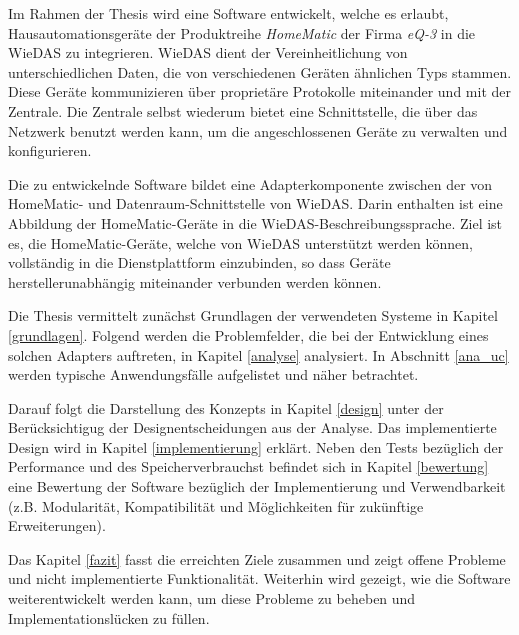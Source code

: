 Im Rahmen der Thesis wird eine Software entwickelt, welche es erlaubt, Hausautomationsgeräte der Produktreihe
\emph{HomeMatic} der Firma \emph{eQ-3} in die WieDAS zu integrieren.
WieDAS dient der Vereinheitlichung von unterschiedlichen Daten, die von verschiedenen Geräten ähnlichen
Typs stammen.
Diese Geräte kommunizieren über proprietäre Protokolle miteinander und mit der Zentrale.
Die Zentrale selbst wiederum bietet eine Schnittstelle, die über das Netzwerk benutzt werden kann, um die
angeschlossenen Geräte zu verwalten und konfigurieren.

Die zu entwickelnde Software bildet eine Adapterkomponente zwischen der von HomeMatic- und Datenraum-Schnittstelle von
WieDAS.
Darin enthalten ist eine Abbildung der HomeMatic-Geräte in die WieDAS-Beschreibungssprache.
Ziel ist es, die HomeMatic-Geräte, welche von WieDAS unterstützt werden können, vollständig in die
Dienstplattform einzubinden, so dass Geräte herstellerunabhängig miteinander verbunden werden können.

Die Thesis vermittelt zunächst Grundlagen der verwendeten Systeme in Kapitel \ref{grundlagen}.
Folgend werden die Problemfelder, die bei der Entwicklung eines solchen Adapters auftreten, in
Kapitel \ref{analyse} analysiert.
In Abschnitt \ref{ana_uc} werden typische Anwendungsfälle aufgelistet und näher betrachtet.

Darauf folgt die Darstellung des Konzepts in Kapitel \ref{design} unter der Berücksichtigug der
Designentscheidungen aus der Analyse.
Das implementierte Design wird in Kapitel \ref{implementierung} erklärt.
Neben den Tests bezüglich der Performance und des Speicherverbrauchst befindet sich in Kapitel
\ref{bewertung} eine Bewertung der Software bezüglich der Implementierung und Verwendbarkeit
(z.B. Modularität, Kompatibilität und Möglichkeiten für zukünftige Erweiterungen).

Das Kapitel \ref{fazit} fasst die erreichten Ziele zusammen und zeigt
offene Probleme und nicht implementierte Funktionalität.
Weiterhin wird gezeigt, wie die Software weiterentwickelt werden kann, um diese Probleme
zu beheben und Implementationslücken zu füllen.
